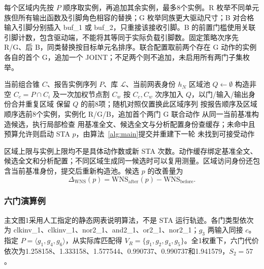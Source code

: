 \documentclass[twocolumn,10pt,fontset=windows]{ctexart}
\renewcommand{\eqref}[1]{\textup{（\ref{#1}）}}
\begin{document}
每个区域内先按 $P$ 顺序取实例，再追加其余实例，最多8个实例。R 枚举不同单元族但所有输出函数及引脚角色相容的替换；G 枚举同族更大驱动尺寸；B 对合格输入引脚分别插入 buf\_1 或 buf\_2，只重接该接收引脚。B 的前置门槛使用关联引脚计数，包含驱动端，不能将其等同于实际负载引脚数。固定策略次序先 R/G、后 B，同类替换按目标单元名排序。联合配置取前两个存在 G 动作的实例各自的首个 G，追加一个 JOINT；不足两个则不追加，未启用所有两门子集枚举。

\begin{algorithm}[htbp]
\footnotesize
\caption{覆盖优先的区域与动作调度}\label{alg:regions}
\begin{algorithmic}[1]
\Require 当前组合锥 $C$、报告实例序列 $P$、库 $\mathcal L$、当前网表身份 $h_N$
\State 区域池 $Q\gets\emptyset$
  \State 构造非空 $C_c=P\cap C_i$ 及一次加权节点割 $C_w$
  \State 按 $C_c,C_w$ 次序加入 $Q$，以门/输入/输出身份合并重复区域
\EndFor
\State 保留 $Q$ 的前8项；随机对照仅置换此区域序列
  \State 按报告顺序及区域顺序选前8个实例，实例化 R/G/B，追加首个两门 G 联合动作
    \State 从同一当前基准构造候选，执行局部检查
    \State 用基准全文、候选全文与分析配置身份查缓存；未命中且预算允许则启动 STA
    \If{$p$ 满足式~\eqref{eq:accept}及启用的物理门控}
      \State \Return $p$，由算法~\ref{alg:main}提交并重建下一轮
    \EndIf
  \EndFor
\EndFor
\State \Return 未找到可接受动作
\end{algorithmic}
\end{algorithm}

区域上限与实例上限均不是具体动作数或新 STA 次数。动作缓存绑定基准全文、候选全文和分析配置；不同区域生成同一候选时可以复用测量。区域访问身份还包含当前基准身份，提交后重新构造池。候选 $p$ 的改善量为
\begin{equation}\label{eq:dtiming}
\Delta_{\mathrm{WNS}}(p)=\mathrm{WNS}_{\mathrm{after}}(p)-\mathrm{WNS}_{\mathrm{before}}.
\end{equation}

\subsubsection{六门演算例}
主文图1采用人工指定的静态网表说明算法，不是 STA 运行轨迹。各门类型依次为 clkinv\_1、clkinv\_1、nor2\_1、and2\_1、or2\_1、nor2\_1；$g_3$ 两输入同接 $c$。指定 $P=\langle g_1,g_4,g_6\rangle$，从实际库匹配得 $V_R=\{g_1,g_2,g_4,g_5\}$。全1权重下，六门代价依次为1.258158、1.333158、1.577544、0.990737、0.990737和1.941579，$S_2=57$。
\end{document}
